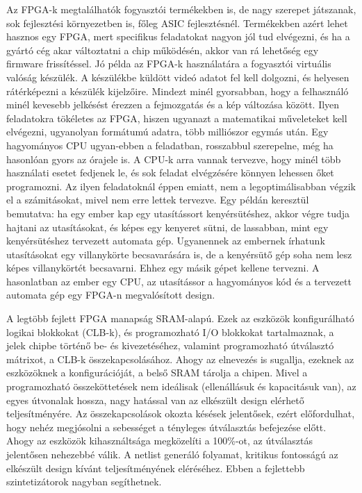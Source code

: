 \documentclass[a4paper,12pt,oneside]{book}
\begin{document}
Az FPGA-k megtalálhatók fogyasztói termékekben is, de nagy szerepet játszanak, sok fejlesztési környezetben is, főleg ASIC fejlesztésnél. Termékekben azért lehet hasznos egy FPGA, mert specifikus feladatokat nagyon jól tud elvégezni, és ha a gyártó cég akar változtatni a chip működésén, akkor van rá lehetőség egy firmware frissítéssel. Jó példa az FPGA-k használatára a fogyasztói virtuális valóság készülék. A készülékbe küldött videó adatot fel kell dolgozni, és helyesen rátérképezni a készülék kijelzőire. Mindezt minél gyorsabban, hogy a felhasználó minél kevesebb jelkésést érezzen a fejmozgatás és a kép változása között. Ilyen feladatokra tökéletes az FPGA, hiszen ugyanazt a matematikai műveleteket kell elvégezni, ugyanolyan formátumú adatra, több milliószor egymás után. Egy hagyományos CPU ugyan-ebben a feladatban, rosszabbul szerepelne, még ha hasonlóan gyors az órajele is. A CPU-k arra vannak tervezve, hogy minél több használati esetet fedjenek le, és sok feladat elvégzésére könnyen lehessen őket programozni. Az ilyen feladatoknál éppen emiatt, nem a legoptimálisabban végzik el a számitásokat, mivel nem erre lettek tervezve. Egy példán keresztül bemutatva: ha egy ember kap egy utasítássort kenyérsütéshez, akkor végre tudja hajtani az utasításokat, és képes egy kenyeret sütni, de lassabban, mint egy kenyérsütéshez tervezett automata gép. Ugyanennek az embernek írhatunk utasításokat egy villanykörte becsavarására is, de a kenyérsütő gép soha nem lesz képes villanykörtét becsavarni. Ehhez egy másik gépet kellene tervezni. A hasonlatban az ember egy CPU, az utasítássor a hagyományos kód és a tervezett automata gép egy FPGA-n megvalósított design.

A legtöbb fejlett FPGA manapság SRAM-alapú. Ezek az eszközök konfigurálható logikai blokkokat (CLB-k), és programozható I/O blokkokat tartalmaznak, a jelek chipbe történő be- és kivezetéséhez, valamint programozható útválasztó mátrixot, a CLB-k összekapcsolásához. Ahogy az elnevezés is sugallja, ezeknek az eszközöknek a konfigurációját, a belső SRAM tárolja a chipen. Mivel a programozható összeköttetések nem ideálisak (ellenállásuk és kapacitásuk van), az egyes útvonalak hossza, nagy hatással van az elkészült design elérhető teljesítményére. Az összekapcsolások okozta késések jelentősek, ezért előfordulhat, hogy nehéz megjósolni a sebességet a tényleges útválasztás befejezése előtt. Ahogy az eszközök kihasználtsága megközelíti a 100\%-ot, az útválasztás jelentősen nehezebbé válik. A netlist generáló folyamat, kritikus fontosságú az elkészült design kívánt teljesítményének eléréséhez. Ebben a fejlettebb szintetizátorok nagyban segíthetnek. 
\end{document}
